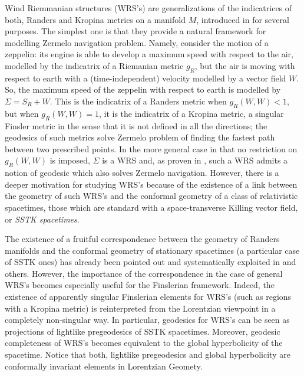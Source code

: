 \documentclass[reqno,10pt]{amsart}
\begin{document}
Wind Riemmanian structures (WRS's) are generalizations of the indicatrices of both,  Randers and Kropina metrics on a manifold $M$, introduced in \cite{CJS} for several purposes. The simplest one is that 
they provide a natural framework for modelling 
Zermelo navigation problem. Namely, consider the motion of a zeppelin: its engine is able to develop a maximum speed with respect to the air, modelled by the indicatrix of a Riemanian metric $g_R$, but the air is moving with respect to earth with a (time-independent) velocity modelled by a vector field $W$. So, the maximum speed of the zeppelin with respect to earth is modelled by $\Sigma=S_R+W$. This is the indicatrix of a Randers metric when $g_R(W,W)<1$,   but when $g_R(W,W)=1$, it is the indicatrix of a Kropina metric, a singular Finsler metric in the sense that it is not defined in all the directions;  the geodesics of such metrics solve Zermelo problem of finding the fastest path between two prescribed points. In the more general case in that no restriction on $g_R(W,W)$ is imposed, $\Sigma$ is a WRS and,  as proven in \cite{CJS}, such a WRS admits a notion of geodesic which also solves Zermelo navigation. However, there is a deeper motivation for  studying  WRS's  because of  the existence of a link between the geometry of such WRS's and the conformal geometry of a class of relativistic spacetimes, those which are standard with a space-transverse Killing
vector field, or {\em SSTK spacetimes}.

 The existence of a fruitful correspondence between the geometry of Randers manifolds and the conformal geometry of stationary  spacetimes (a particular case of SSTK ones) has already been  pointed out and systematically exploited in \cite{CaJaMa, CJS, FHS, GHWW,JLP15} and others.
However, the importance of the correspondence in the case of general WRS's becomes especially useful for the Finslerian framework. Indeed, the existence of apparently singular Finslerian elements for WRS's  (such as regions with a Kropina metric) is reinterpreted from the Lorentzian viewpoint in a completely non-singular way. In particular, geodesics for WRS's can be seen as projections of lightlike pregeodesics  of SSTK spacetimes. Moreover, geodesic completeness of WRS's becomes equivalent to the global hyperbolicity  of the spacetime.    Notice that both, lightlike pregeodesics and global hyperbolicity are conformally invariant elements in Lorentzian Geomety.
\end{document}
